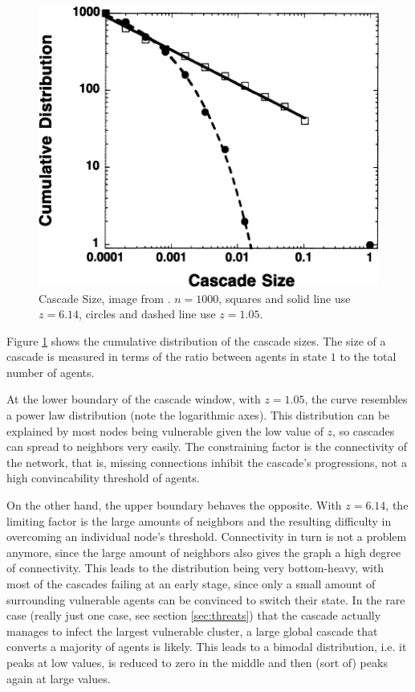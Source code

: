 \documentclass{sig-alternate-05-2015}
\begin{document}
\begin{figure}[h!]
  \centering
  \includegraphics[width=\columnwidth]{img/cascade-size}
  \caption{Cascade Size, image from \cite{simplemodel}. $n = 1000$, squares and solid line use $z = 6.14$, circles and dashed line use $z = 1.05$.}
  \label{fig:cascade-size}
\end{figure}

Figure \ref{fig:cascade-size} shows the cumulative distribution of the cascade sizes. The size of a cascade is measured in terms of the ratio between agents in state $1$ to the total number of agents.

At the lower boundary of the cascade window, with $z = 1.05$, the curve resembles a power law distribution (note the logarithmic axes). This distribution can be explained by most nodes being vulnerable given the low value of $z$, so cascades can spread to neighbors very easily. The constraining factor is the connectivity of the network, that is, missing connections inhibit the cascade's progressions, not a high convincability threshold of agents.

On the other hand, the upper boundary behaves the opposite. With $z = 6.14$, the limiting factor is the large amounts of neighbors and the resulting difficulty in overcoming an individual node's threshold. Connectivity in turn is not a problem anymore, since the large amount of neighbors also gives the graph a high degree of connectivity. This leads to the distribution being very bottom-heavy, with most of the cascades failing at an early stage, since only a small amount of surrounding vulnerable agents can be convinced to switch their state. In the rare case (really just one case, see section \ref{sec:threats}) that the cascade actually manages to infect the largest vulnerable cluster, a large global cascade that converts a majority of agents is likely. This leads to a bimodal distribution, i.e. it peaks at low values, is reduced to zero in the middle and then (sort of) peaks again at large values.
\end{document}
